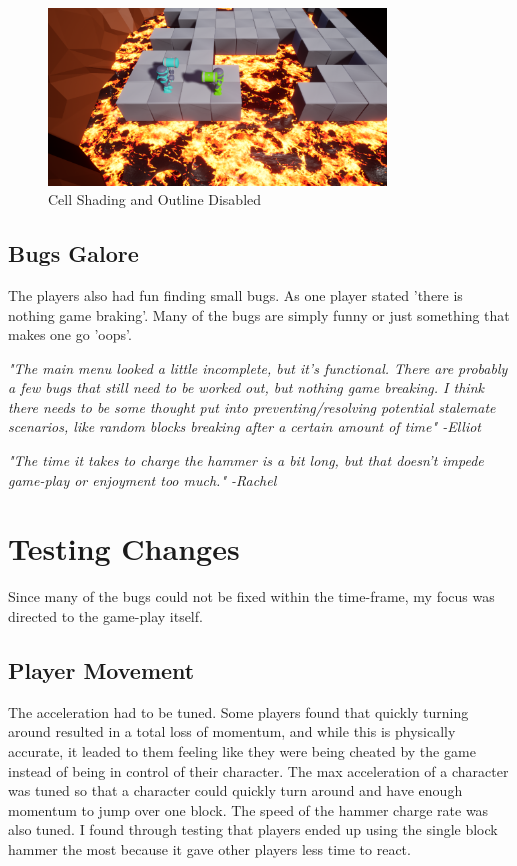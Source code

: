 \documentclass[conference,compsoc]{IEEEtran}
\begin{document}
\begin{figure}[b]
  \centering
  \includegraphics[width=0.8\textwidth]{cell_shading_disabled.png}%
  \caption{Cell Shading and Outline Disabled}
\end{figure}

\subsection{Bugs Galore}

The players also had fun finding small bugs. As one player stated 'there is nothing game braking'. Many of the bugs are simply funny or just something that makes one go 'oops'.

\textit{"The main menu looked a little incomplete, but it's functional. There are probably a few bugs that still need to be worked out, but nothing game breaking. I think there needs to be some thought put into preventing/resolving potential stalemate scenarios, like random blocks breaking after a certain amount of time" -Elliot}

\textit{"The time it takes to charge the hammer is a bit long, but that doesn’t impede game-play or enjoyment too much." -Rachel}

\section{Testing Changes}
Since many of the bugs could not be fixed within the time-frame, my focus was directed to the game-play itself.

\subsection{Player Movement}

The acceleration had to be tuned. Some players found that quickly turning around resulted in a total loss of momentum, and while this is physically accurate, it leaded to them feeling like they were being cheated by the game instead of being in control of their character. The max acceleration of a character was tuned so that a character could quickly turn around and have enough momentum to jump over one block.
The speed of the hammer charge rate was also tuned. I found through testing that players ended up using the single block hammer the most because it gave other players less time to react.
\end{document}
